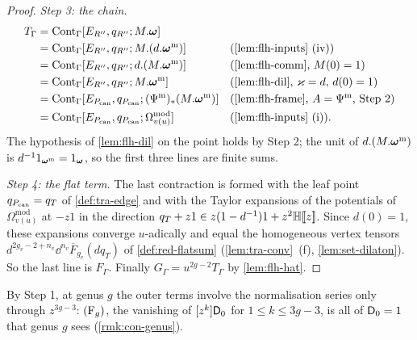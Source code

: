 \begin{proof}
\emph{Step 3: the chain.}
\begin{align*}
T_\Gamma&=\mathrm{Cont}_\Gamma[E_{R''},q_{R''};M.\TFT]&&\\
&=\mathrm{Cont}_\Gamma[E_{R''},q_{R''};M.(d.\TFT^{\mathrm m})]&&\text{(\cref{lem:flh-inputs}~(iv))}\\
&=\mathrm{Cont}_\Gamma[E_{R''},q_{R''};d.(M.\TFT^{\mathrm m})]&&\text{(\cref{lem:flh-comm}, $M(0)=1$)}\\
&=\mathrm{Cont}_\Gamma[E_{R''},q_{R''};M.\TFT^{\mathrm m}]&&\text{(\cref{lem:flh-dil}, $\varkappa=d$, $d(0)=1$)}\\
&=\mathrm{Cont}_\Gamma[E_{\Pc},q_{\Pc};(\Psi^{\mathrm m})_*(M.\TFT^{\mathrm m})]&&\text{(\cref{lem:flh-frame}, $A=\Psi^{\mathrm m}$, Step 2)}\\
&=\mathrm{Cont}_\Gamma[E_{\Pc},q_{\Pc};\Omega^{\mathrm{mod}}_{v(u)}]&&\text{(\cref{lem:flh-inputs}~(i))}.
\end{align*}
The hypothesis of \cref{lem:flh-dil} on the point holds by Step 2; the unit of $d.(M.\boldsymbol{\omega}^{\mathrm m})$ is $d^{-1}1_{\boldsymbol{\omega}^{\mathrm m}}=1_{\boldsymbol{\omega}}$, so the first three lines are finite sums.

\emph{Step 4: the flat term.} The last contraction is formed with the leaf point $q_{P_{\mathrm{can}}}=q_T$ of \cref{def:tra-edge} and with the Taylor expansions of the potentials of $\Omega^{\mathrm{mod}}_{v(u)}$ at $-z1$ in the direction $q_T+z1\in z(1-d^{-1})1+z^2\mathbb{H}[\![ z ]\!]$. Since $d(0)=1$, these expansions converge $u$-adically and equal the homogeneous vertex tensors $d^{2g_v-2+n_v}\dd^{n_v}\overline F_{g_v}(dq_T)$ of \cref{def:red-flatsum} (\cref{lem:tra-conv}~(f), \cref{lem:set-dilaton}). So the last line is $F_\Gamma$. Finally $G_\Gamma=u^{2g-2}T_\Gamma$ by \cref{lem:flh-hat}.
\end{proof}

By Step 1, at genus $g$ the outer terms involve the normalisation series only through $z^{3g-3}$: $(\mathrm{F}_{g})$, the vanishing of $[z^k]\mathsf{D}_0$ for $1\leq k\leq 3g-3$, is all of $\mathsf{D}_0=1$ that genus $g$ sees (\cref{rmk:con-genus}).

